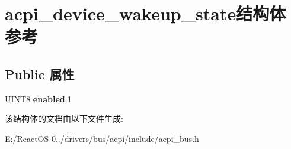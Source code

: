\hypertarget{structacpi__device__wakeup__state}{}\section{acpi\+\_\+device\+\_\+wakeup\+\_\+state结构体 参考}
\label{structacpi__device__wakeup__state}
\subsection*{Public 属性}
\begin{DoxyCompactItemize}
\item 
\mbox{\label{structacpi__device__wakeup__state_af53702dfd59c33cf6fdc02211d1c5038}} 
\hyperlink{_processor_bind_8h_ab27e9918b538ce9d8ca692479b375b6a}{U\+I\+N\+T8} {\bfseries enabled}\+:1
\end{DoxyCompactItemize}


该结构体的文档由以下文件生成\+:\begin{DoxyCompactItemize}
\item 
E\+:/\+React\+O\+S-\/0../drivers/bus/acpi/include/acpi\+\_\+bus.\+h\end{DoxyCompactItemize}
